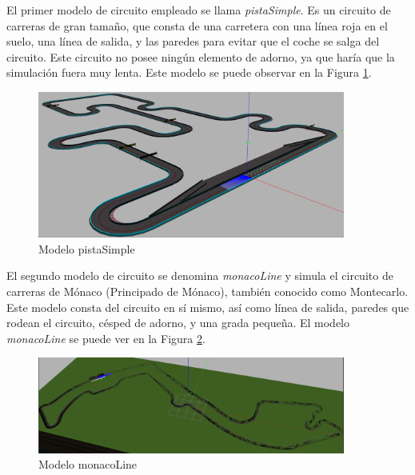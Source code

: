 El primer modelo de circuito empleado se llama \textit{pistaSimple}. Es un circuito de carreras de gran tamaño, que consta de una carretera con una línea roja en el suelo, una línea de salida, y las paredes para evitar que el coche se salga del circuito. Este circuito no posee ningún elemento de adorno, ya que haría que la simulación fuera muy lenta. Este modelo se puede observar en la Figura \ref{fig.simple}.\\

\begin{figure}
  \begin{center}
    \includegraphics[width=0.9\textwidth]{figures/Infraestructura/circuit_Simple.png}
		\caption{Modelo pistaSimple}
		\label{fig.simple}
		\end{center}
\end{figure}

El segundo modelo de circuito se denomina \textit{monacoLine} y simula el circuito de carreras de Mónaco (Principado de Mónaco), también conocido como Montecarlo. Este modelo consta del circuito en sí mismo, así como línea de salida, paredes que rodean el circuito, césped de adorno, y una grada pequeña. El modelo \textit{monacoLine} se puede ver en la Figura \ref{fig.monaco}.\\


\begin{figure}
  \begin{center}
    \includegraphics[width=0.9\textwidth]{figures/Infraestructura/circuit_Monaco.png}
		\caption{Modelo monacoLine}
		\label{fig.monaco}
		\end{center}
\end{figure}

